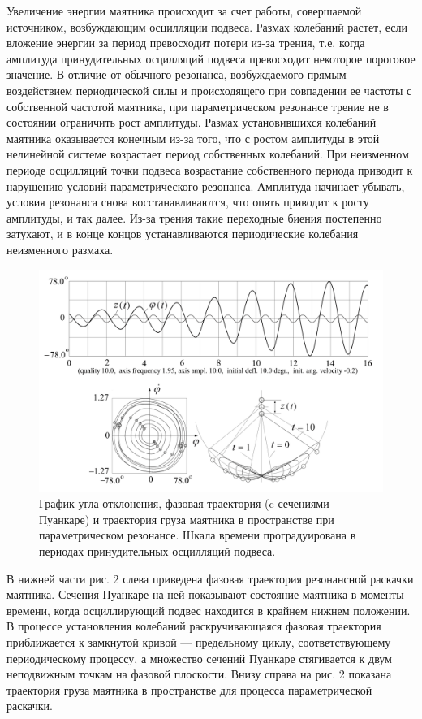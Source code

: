 \documentclass[a4paper,12pt]{article} %
\begin{document}
Увеличение энергии маятника происходит за счет работы, совершаемой источником, возбуждающим осцилляции подвеса. Размах колебаний растет, если вложение энергии за период превосходит потери из-за трения, т.е. когда амплитуда принудительных осцилляций подвеса превосходит некоторое пороговое значение. В отличие от обычного резонанса, возбуждаемого прямым воздействием периодической силы и происходящего при совпадении ее частоты с собственной частотой маятника, при параметрическом резонансе трение не в состоянии ограничить рост амплитуды. Размах установившихся колебаний маятника оказывается конечным из-за того, что с ростом амплитуды в этой нелинейной системе возрастает период собственных колебаний. При неизменном периоде осцилляций точки подвеса возрастание собственного периода приводит к нарушению условий параметрического резонанса. Амплитуда начинает убывать, условия резонанса снова восстанавливаются, что опять приводит к росту амплитуды, и так далее. Из-за трения такие переходные биения постепенно затухают, и в конце концов устанавливаются периодические колебания неизменного размаха.
\begin{figure}[h]
\centering
\includegraphics[scale=0.35]{5}
\caption{График угла отклонения, фазовая траектория (c сечениями Пуанкаре) и траектория груза маятника в пространстве при параметрическом резонансе. Шкала времени проградуирована в периодах принудительных осцилляций подвеса.}
\end{figure}

В нижней части рис. 2 слева приведена фазовая траектория резонансной раскачки маятника. Сечения Пуанкаре на ней показывают состояние маятника в моменты времени, когда осциллирующий подвес находится в крайнем нижнем положении. В процессе установления колебаний раскручивающаяся фазовая траектория приближается к замкнутой кривой — предельному циклу, соответствующему периодическому процессу, а множество сечений Пуанкаре стягивается к двум неподвижным точкам на фазовой плоскости. Внизу справа на рис. 2 показана траектория груза маятника в пространстве для процесса параметрической раскачки.
\end{document}
